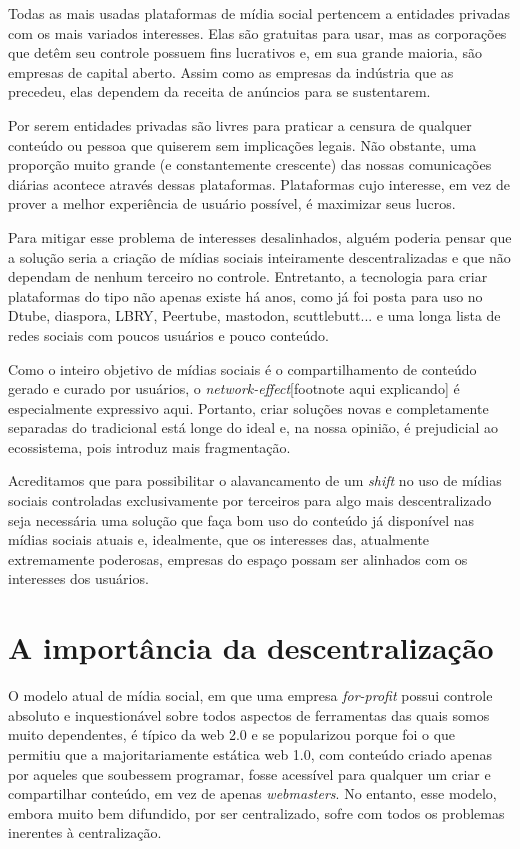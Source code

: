 Todas as mais usadas plataformas de mídia social pertencem a entidades privadas com os mais variados interesses.
Elas são gratuitas para usar, mas as corporações que detêm seu controle possuem fins lucrativos e, em sua grande maioria, são empresas de capital aberto.
Assim como as empresas da indústria que as precedeu, elas dependem da receita de anúncios para se sustentarem.

Por serem entidades privadas são livres para praticar a censura de qualquer conteúdo ou pessoa que quiserem sem implicações legais.
Não obstante, uma proporção muito grande (e constantemente crescente) das nossas comunicações diárias acontece através dessas plataformas.
Plataformas cujo interesse, em vez de prover a melhor experiência de usuário possível, é maximizar seus lucros.

Para mitigar esse problema de interesses desalinhados, alguém poderia pensar que a solução seria a criação de mídias sociais inteiramente descentralizadas e que não dependam de nenhum terceiro no controle.
Entretanto, a tecnologia para criar plataformas do tipo não apenas existe há anos, como já foi posta para uso no Dtube, diaspora, LBRY, Peertube, mastodon, scuttlebutt... e uma longa lista de redes sociais com poucos usuários e pouco conteúdo.

Como o inteiro objetivo de mídias sociais é o compartilhamento de conteúdo gerado e curado por usuários, o \textit{network-effect}[footnote aqui explicando] é especialmente expressivo aqui.
Portanto, criar soluções novas e completamente separadas do tradicional está longe do ideal e, na nossa opinião, é prejudicial ao ecossistema, pois introduz mais fragmentação.

Acreditamos que para possibilitar o alavancamento de um \textit{shift} no uso de mídias sociais controladas exclusivamente por terceiros para algo mais descentralizado seja necessária uma solução que faça bom uso do conteúdo já disponível nas mídias sociais atuais e, idealmente, que os interesses das, atualmente extremamente poderosas, empresas do espaço possam ser alinhados com os interesses dos usuários. 

\section{A importância da descentralização}

O modelo atual de mídia social, em que uma empresa \textit{for-profit} possui controle absoluto e inquestionável sobre todos aspectos de ferramentas das quais somos muito dependentes, é típico da web 2.0 e se popularizou porque foi o que permitiu que a majoritariamente estática web 1.0, com conteúdo criado apenas por aqueles que soubessem programar, fosse acessível para qualquer um criar e compartilhar conteúdo, em vez de apenas \textit{webmasters}.
No entanto, esse modelo, embora muito bem difundido, por ser centralizado, sofre com todos os problemas inerentes à centralização. 

